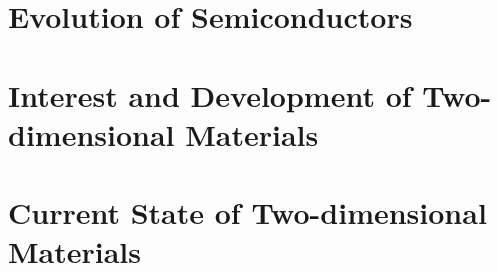 \section{Evolution of Semiconductors}\label{sec:semicond_evolution}

\section{Interest and Development of Two-dimensional Materials}\label{sec:2D_development}

\section{Current State of Two-dimensional Materials}\label{sec:current_state}